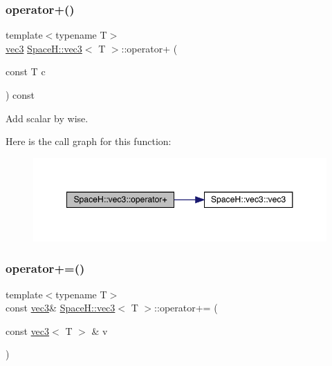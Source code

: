 \subsubsection{\texorpdfstring{operator+()}{operator+()}\hspace{0.1cm}{\footnotesize\ttfamily [7/7]}}
{\footnotesize\ttfamily template$<$typename T$>$ \\
\mbox{\hyperlink{struct_space_h_1_1vec3}{vec3}} \mbox{\hyperlink{struct_space_h_1_1vec3}{Space\+H\+::vec3}}$<$ T $>$\+::operator+ (\begin{DoxyParamCaption}\item[{const T}]{c }\end{DoxyParamCaption}) const\hspace{0.3cm}{\ttfamily [inline]}}



Add scalar by wise. 

Here is the call graph for this function\+:
\nopagebreak
\begin{figure}[H]
\begin{center}
\leavevmode
\includegraphics[width=348pt]{struct_space_h_1_1vec3_a9271a40ff2a3d64a97f37e53fb668d07_cgraph}
\end{center}
\end{figure}
\mbox{\label{struct_space_h_1_1vec3_a5a9143627e21c4b343b4ac44a5759cc8}} 
\subsubsection{\texorpdfstring{operator+=()}{operator+=()}\hspace{0.1cm}{\footnotesize\ttfamily [1/7]}}
{\footnotesize\ttfamily template$<$typename T$>$ \\
const \mbox{\hyperlink{struct_space_h_1_1vec3}{vec3}}\& \mbox{\hyperlink{struct_space_h_1_1vec3}{Space\+H\+::vec3}}$<$ T $>$\+::operator+= (\begin{DoxyParamCaption}\item[{const \mbox{\hyperlink{struct_space_h_1_1vec3}{vec3}}$<$ T $>$ \&}]{v }\end{DoxyParamCaption})\hspace{0.3cm}{\ttfamily [inline]}}

